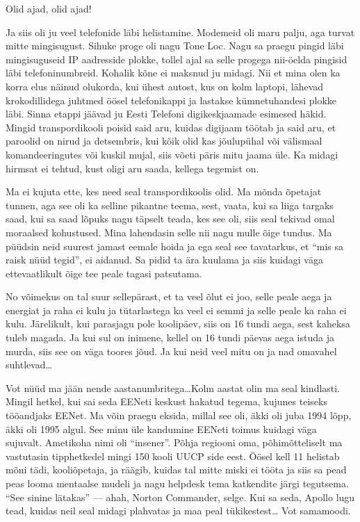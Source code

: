 Olid ajad, olid ajad!

Ja siis oli ju veel  telefonide läbi helistamine. Modemeid oli maru palju, aga 
turvat mitte mingisugust. Sihuke proge oli nagu Tone Loc. Nagu sa praegu pingid 
läbi mingisuguseid IP aadresside plokke, tollel ajal sa selle progega nii-öelda 
pingisid läbi telefoninumbreid.  Kohalik kõne ei maksnud ju midagi. Nii et mina 
olen ka korra elus näinud olukorda, kui  ühest autost, kus on kolm laptopi, 
lähevad krokodillidega juhtmed öösel telefonikappi ja  lastakse kümnetuhandesi 
plokke läbi. Sinna etappi jäävad ju Eesti Telefoni digikeskjaamade esimesed 
häkid. Mingid transpordikooli poisid said aru, kuidas digijaam töötab ja said 
aru, et paroolid on nirud ja detsembris, kui kõik olid kas jõulupühal või 
välismaal komandeeringutes või kuskil mujal, siis võeti päris mitu jaama üle. 
Ka midagi hirmsat ei tehtud, kust oligi aru saada, kellega tegemist on. 


Ma ei kujuta ette, kes need seal transpordikoolis olid. Ma mõnda õpetajat 
tunnen, aga see oli ka selline pikantne teema, sest, vaata, kui sa liiga 
targaks saad, kui sa saad lõpuks nagu täpselt teada, kes see oli, siis seal 
tekivad omal moraalsed kohustused. Mina lahendasin selle nii nagu mulle õige 
tundus. Ma püüdsin neid suurest jamast eemale hoida ja ega seal see tavatarkus, 
et \enquote{mis sa raisk nüüd tegid},  ei aidanud.  Sa pidid ta ära kuulama ja 
siis kuidagi väga ettevaatlikult õige tee peale tagasi patsutama. 


No võimekus on tal suur sellepärast, et ta veel õlut ei joo, selle peale aega 
ja energiat ja raha ei kulu ja tütarlastega ka veel ei semmi ja selle peale ka 
raha ei kulu. Järelikult, kui parasjagu pole koolipäev, siis on 16 tundi aega, 
sest kaheksa tuleb magada. Ja kui sul on inimene, kellel on 16 tundi päevas 
aega istuda ja murda, siis see on väga toores jõud. Ja kui neid veel mitu on ja 
nad omavahel suhtlevad\ldots


Vot nüüd ma jään nende aastanumbritega\ldots Kolm aastat olin ma seal 
kindlasti. Mingil hetkel, kui sai seda EENeti keskust hakatud 
tegema, kujunes teiseks tööandjaks EENet. Ma võin praegu eksida, millal see 
oli, äkki oli juba 1994 lõpp, äkki oli 1995 algul. See minu üle kandumine 
EENeti toimus kuidagi väga sujuvalt. Ametikoha nimi oli \enquote{insener}. 
Põhja regiooni oma, põhimõtteliselt ma vastutasin  tipphetkedel mingi 150 kooli 
UUCP side eest. Öösel kell 11 helistab mõni tädi,  kooliõpetaja, ja räägib, 
kuidas tal mitte miski ei tööta ja  siis sa pead peas looma mentaalse mudeli ja 
nagu helpdesk  tema katkendite järgi tegutsema. \enquote{See sinine lätakas} 
--- ahah, Norton Commander, selge. Kui sa seda, Apollo lugu tead, kuidas neil 
seal midagi plahvatas ja maa peal tükikestest\ldots {} Vot samamoodi. 

